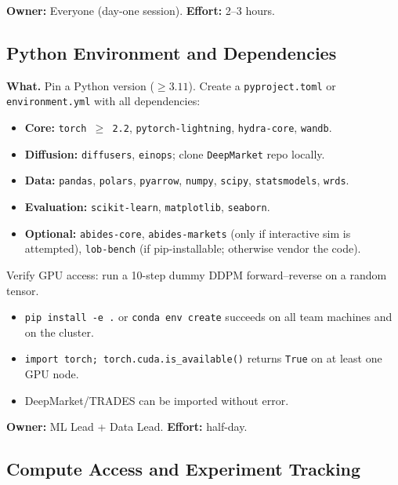 \documentclass[11pt,a4paper]{article}
\begin{document}
\textbf{Owner:} Everyone (day-one session). \quad \textbf{Effort:} 2--3 hours.

\subsection{Python Environment and Dependencies}

\textbf{What.}
Pin a Python version ($\geq 3.11$). Create a \texttt{pyproject.toml} or \texttt{environment.yml} with all dependencies:

\begin{itemize}[nosep]
  \item \textbf{Core:} \texttt{torch $\geq$ 2.2}, \texttt{pytorch-lightning}, \texttt{hydra-core}, \texttt{wandb}.
  \item \textbf{Diffusion:} \texttt{diffusers}, \texttt{einops}; clone \texttt{DeepMarket} repo locally.
  \item \textbf{Data:} \texttt{pandas}, \texttt{polars}, \texttt{pyarrow}, \texttt{numpy}, \texttt{scipy}, \texttt{statsmodels}, \texttt{wrds}.
  \item \textbf{Evaluation:} \texttt{scikit-learn}, \texttt{matplotlib}, \texttt{seaborn}.
  \item \textbf{Optional:} \texttt{abides-core}, \texttt{abides-markets} (only if interactive sim is attempted), \texttt{lob-bench} (if pip-installable; otherwise vendor the code).
\end{itemize}

Verify GPU access: run a 10-step dummy DDPM forward--reverse on a random tensor.

\begin{successbox}
  \begin{itemize}[nosep]
    \item \texttt{pip install -e .} or \texttt{conda env create} succeeds on all team machines and on the cluster.
    \item \texttt{import torch; torch.cuda.is\_available()} returns \texttt{True} on at least one GPU node.
    \item DeepMarket/TRADES can be imported without error.
  \end{itemize}
\end{successbox}

\textbf{Owner:} ML Lead + Data Lead. \quad \textbf{Effort:} half-day.

\subsection{Compute Access and Experiment Tracking}
\end{document}
